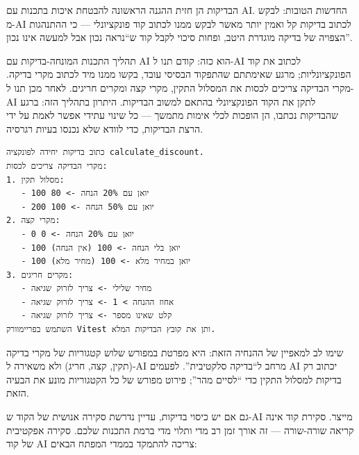


הבדיקות הן חזית ההגנה הראשונה להבטחת איכות בתכנות עם AI. החדשות הטובות: לבקש מ-AI לכתוב בדיקות קל ואמין יותר מאשר לבקש ממנו לכתוב קוד פונקציונלי — כי ההתנהגות הצפויה של בדיקה מוגדרת היטב, ופחות סיכוי לקבל קוד ש“נראה נכון אבל למעשה אינו נכון”.

תהליך התכנות המונחה-בדיקות עם AI הוא כזה: קודם תנו ל-AI לכתוב את קוד הפונקציונליות; מרגע שאימתתם שהתפקוד הבסיסי עובד, בקשו ממנו מיד לכתוב מקרי בדיקה. מקרי הבדיקה צריכים לכסות את המסלול התקין, מקרי קצה ומקרים חריגים. לאחר מכן תנו ל-AI לתקן את הקוד הפונקציונלי בהתאם למשוב הבדיקות. היתרון בתהליך הזה: ברגע שהבדיקות נכתבו, הן הופכות לכלי אימות מתמשך — כל שינוי עתידי אפשר לאמת על ידי הרצת הבדיקות, כדי לוודא שלא נכנסו בעיות רגרסיה.

\begin{lstlisting}
כתוב בדיקות יחידה לפונקציה calculate_discount.
מקרי הבדיקה צריכים לכסות:
1. מסלול תקין:
   - 100 יואן עם 20% הנחה -> 80
   - 200 יואן עם 50% הנחה -> 100
2. מקרי קצה:
   - 0 יואן עם 20% הנחה -> 0
   - 100 יואן בלי הנחה -> 100 (אין הנחה)
   - 100 יואן במחיר מלא -> 100 (מחיר מלא)
3. מקרים חריגים:
   - מחיר שלילי -> צריך לזרוק שגיאה
   - אחוז ההנחה > 1 -> צריך לזרוק שגיאה
   - קלט שאינו מספר -> צריך לזרוק שגיאה
השתמש בפריימוורק Vitest ותן את קובץ הבדיקות המלא.
\end{lstlisting}

שימו לב למאפיין של ההנחיה הזאת: היא מפרטת במפורש שלוש קטגוריות של מקרי בדיקה (תקין, קצה, חריג) ולא משאירה ל-AI מרחב ל“בדיקה סלקטיבית”. לפעמים AI יכתוב רק בדיקות למסלול התקין כדי “לסיים מהר”; פירוט מפורש של כל הקטגוריות מונע את הבעיה הזאת.


גם אם יש כיסוי בדיקות, עדיין נדרשת סקירה אנושית של הקוד ש-AI מייצר. סקירת קוד אינה קריאה שורה-שורה — זה אורך זמן רב מדי ותלוי מדי ברמת התכנות שלכם. סקירה אפקטיבית של קוד AI צריכה להתמקד בממדי המפתח הבאים:

